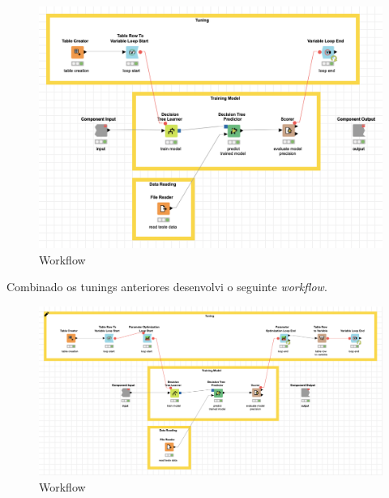 \begin{figure}[H]
    \centering
    \includegraphics[scale=0.4]{Images/T4_b5.png}
    \caption{Workflow}
\end{figure}

Combinado os tunings anteriores desenvolvi o seguinte \textit{workflow}.

\begin{figure}[H]
    \centering
    \includegraphics[scale=0.4]{Images/T4_c1.png}
    \caption{Workflow}
\end{figure}

